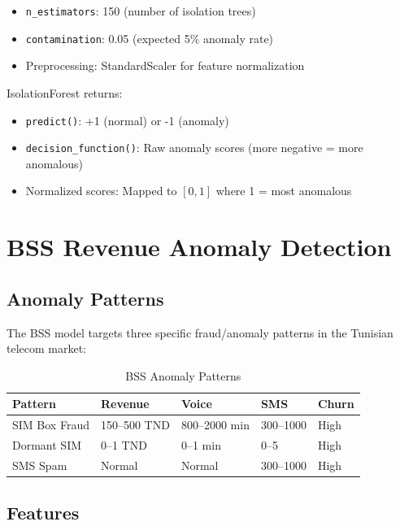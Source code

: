 \begin{itemize}
    \item \texttt{n\_estimators}: 150 (number of isolation trees)
    \item \texttt{contamination}: 0.05 (expected 5\% anomaly rate)
    \item Preprocessing: StandardScaler for feature normalization
\end{itemize}

IsolationForest returns:
\begin{itemize}
    \item \texttt{predict()}: +1 (normal) or -1 (anomaly)
    \item \texttt{decision\_function()}: Raw anomaly scores (more negative = more anomalous)
    \item Normalized scores: Mapped to $[0, 1]$ where 1 = most anomalous
\end{itemize}

\section{BSS Revenue Anomaly Detection}

\subsection{Anomaly Patterns}

The BSS model targets three specific fraud/anomaly patterns in the Tunisian telecom market:

\begin{table}[H]
\centering
\caption{BSS Anomaly Patterns}
\label{tab:bss-patterns}
\begin{tabular}{@{}lllll@{}}
\toprule
\textbf{Pattern} & \textbf{Revenue} & \textbf{Voice} & \textbf{SMS} & \textbf{Churn} \\
\midrule
SIM Box Fraud & 150--500 TND & 800--2000 min & 300--1000 & High \\
Dormant SIM & 0--1 TND & 0--1 min & 0--5 & High \\
SMS Spam & Normal & Normal & 300--1000 & High \\
\bottomrule
\end{tabular}
\end{table}

\subsection{Features}

